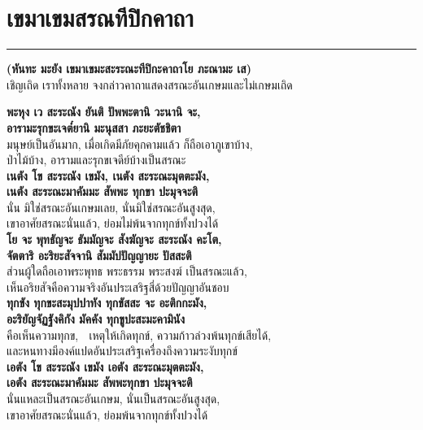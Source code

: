 \documentclass[12pt]{article}
\begin{document}
\section{เขมาเขมสรณทีปิกคาถา}
\hrule
\begin{center}
\textbf{(หันทะ มะยัง เขมาเขมะสะระณะทีปิกะคาถาโย ภะณามะ เส)}\\
เชิญเถิด เราทั้งหลาย จงกล่าวคาถาแสดงสรณะอันเกษมและไม่เกษมเถิด
\end{center}
\textbf{พะหุง เว สะระณัง ยันติ ปัพพะตานิ วะนานิ จะ, \\
อารามะรุกขะเจต๎ยานิ มะนุสสา ภะยะตัชชิตา}\\
\indent มนุษย์เป็นอันมาก, เมื่อเกิดมีภัยคุกคามแล้ว ก็ถือเอาภูเขาบ้าง, \\
\indent ป่าไม้บ้าง, อารามและรุกขเจดีย์บ้างเป็นสรณะ\\
\textbf{เนตัง โข สะระณัง เขมัง, เนตัง สะระณะมุตตะมัง,\\
เนตัง สะระณะมาคัมมะ สัพพะ ทุกขา ปะมุจจะติ}\\
\indent นั่น มิใช่สรณะอันเกษมเลย, นั่นมิใช่สรณะอันสูงสุด,\\
\indent เขาอาศัยสรณะนั่นแล้ว, ย่อมไม่พ้นจากทุกข์ทั้งปวงได้\\
\textbf{โย จะ พุทธัญจะ ธัมมัญจะ สังฆัญจะ สะระณัง คะโต,\\
จัตตาริ อะริยะสัจจานิ สัมมัปปัญญายะ ปัสสะติ}\\
\indent ส่วนผู้ใดถือเอาพระพุทธ พระธรรม พระสงฆ์ เป็นสรณะแล้ว,\\
\indent เห็นอริยสัจคือความจริงอันประเสริฐสี่ด้วยปัญญาอันชอบ\\
\textbf{ทุกขัง ทุกขะสะมุปปาทัง ทุกขัสสะ จะ อะติกกะมัง,\\
อะริยัญจัฏฐังคิกัง มัคคัง ทุกขูปะสะมะคามินัง}\\
\indent คือเห็นความทุกข,  เหตุให้เกิดทุกข์, ความก้าวล่วงพ้นทุกข์เสียได้,\\
\indent และหนทางมีองค์แปดอันประเสริฐเครื่องถึงความระงับทุกข์\\
\textbf{เอตัง โข สะระณัง เขมัง เอตัง สะระณะมุตตะมัง,\\
เอตัง สะระณะมาคัมมะ สัพพะทุกขา ปะมุจจะติ}\\
\indent นั่นแหละเป็นสรณะอันเกษม, นั่นเป็นสรณะอันสูงสุด,\\
\indent เขาอาศัยสรณะนั่นแล้ว, ย่อมพ้นจากทุกข์ทั้งปวงได้\\

\pagebreak
\end{document}
